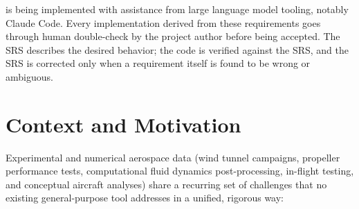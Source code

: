 \begin{noteinfo}
\itc{} is being implemented with assistance from large language model tooling,
notably Claude Code. Every implementation derived from these requirements goes
through human double-check by the project author before being accepted. The
SRS describes the desired behavior; the code is verified against the SRS, and
the SRS is corrected only when a requirement itself is found to be wrong or
ambiguous.
\end{noteinfo}

\section{Context and Motivation}

Experimental and numerical aerospace data (wind tunnel campaigns, propeller performance tests, computational fluid dynamics post-processing, in-flight testing, and conceptual aircraft analyses) share a recurring set of
challenges that no existing general-purpose tool addresses in a unified,
rigorous way:

